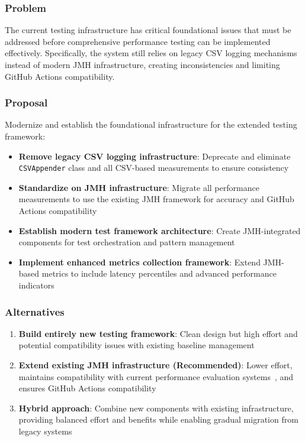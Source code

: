 \documentclass[11pt,a4paper]{article}
\begin{document}
\subsubsection{Problem}
The current testing infrastructure has critical foundational issues that must be addressed before comprehensive performance testing can be implemented effectively. Specifically, the system still relies on legacy CSV logging mechanisms instead of modern JMH infrastructure, creating inconsistencies and limiting GitHub Actions compatibility.

\subsubsection{Proposal}
Modernize and establish the foundational infrastructure for the extended testing framework:
\begin{itemize}
    \item \textbf{Remove legacy CSV logging infrastructure}: Deprecate and eliminate \texttt{CSVAppender} class and all CSV-based measurements to ensure consistency~\cite{jmh2013}
    \item \textbf{Standardize on JMH infrastructure}: Migrate all performance measurements to use the existing JMH framework for accuracy and GitHub Actions compatibility
    \item \textbf{Establish modern test framework architecture}: Create JMH-integrated components for test orchestration and pattern management
    \item \textbf{Implement enhanced metrics collection framework}: Extend JMH-based metrics to include latency percentiles and advanced performance indicators
\end{itemize}

\subsubsection{Alternatives}
\begin{enumerate}
    \item \textbf{Build entirely new testing framework}: Clean design but high effort and potential compatibility issues with existing baseline management
    \item \textbf{Extend existing JMH infrastructure (Recommended)}: Lower effort, maintains compatibility with current performance evaluation systems~\cite{blackburn2006dacapo}, and ensures GitHub Actions compatibility~\cite{github_actions}
    \item \textbf{Hybrid approach}: Combine new components with existing infrastructure, providing balanced effort and benefits while enabling gradual migration from legacy systems
\end{enumerate}
\end{document}
